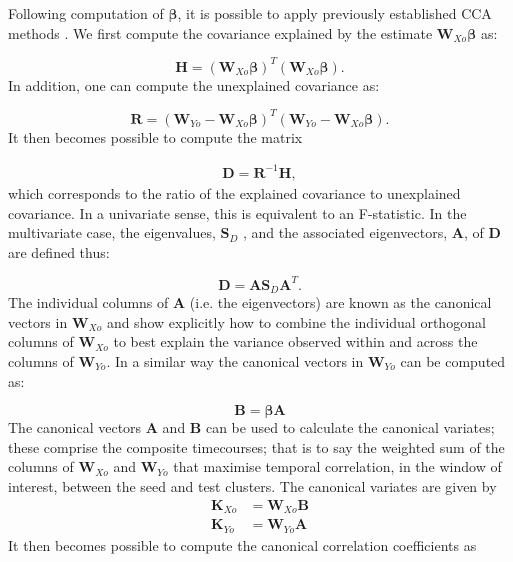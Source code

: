 \clearpage
Following computation of $\mathbf{\beta}$, it is possible to apply previously established CCA methods \citep{Soto2009,Soto2010,Barnes2011,Brookes2012b}. We first compute the covariance explained by the estimate $\mathbf{W}_{Xo}\mathbf{\beta}$ as:

\begin{equation}
\mathbf{H} = ( \mathbf{W}_{Xo}\mathbf{\beta})^T( \mathbf{W}_{Xo}\mathbf{\beta}).
\end{equation} In addition, one can compute the unexplained covariance as: 

\begin{equation}
\mathbf{R} = (\mathbf{W}_{Yo} - \mathbf{W}_{Xo}\mathbf{\beta})^T(\mathbf{W}_{Yo} - \mathbf{W}_{Xo}\mathbf{\beta}).
\end{equation} It then becomes possible to compute the matrix

\begin{eqnarray}
\mathbf{D} =  \mathbf{R}^{-1}\mathbf{H},
\end{eqnarray} which corresponds to the ratio of the explained covariance to unexplained covariance. In a univariate sense, this is equivalent to an F-statistic. In the multivariate case, the eigenvalues, $\mathbf{S}_D$ , and the associated eigenvectors, \textbf{A}, of \textbf{D} are defined thus:

\begin{equation}
\mathbf{D} = \mathbf{AS}_D\mathbf{A}^T.
\end{equation} The individual columns of \textbf{A} (i.e. the eigenvectors) are known as the canonical vectors in $\mathbf{W}_{Xo}$ and show explicitly how to combine the individual orthogonal columns of $\mathbf{W}_{Xo}$ to best explain the variance observed within and across the columns of $\mathbf{W}_{Yo}$. In a similar way the canonical vectors in $\mathbf{W}_{Yo}$ can be computed as:


\begin{equation}
\mathbf{B} = \mathbf{\beta A}
\end{equation} The canonical vectors \textbf{A} and \textbf{B} can be used to calculate the canonical variates; these comprise the composite timecourses; that is to say the weighted sum of the columns of $\mathbf{W}_{Xo}$ and $\mathbf{W}_{Yo}$ that maximise temporal correlation, in the window of interest, between the seed and test clusters. The canonical variates are given by
\begin{equation}
\begin{aligned}
\mathbf{K}_{Xo} &= \mathbf{W}_{Xo}\mathbf{B} \\
\mathbf{K}_{Yo} &= \mathbf{W}_{Yo}\mathbf{A}
\end{aligned}
\end{equation}
It then becomes possible to compute the canonical correlation coefficients as

